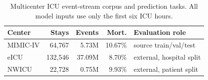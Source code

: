 \begin{table}[t]
\caption{Multicenter ICU event-stream corpus and prediction tasks. All model inputs use only the first six ICU hours.}
\label{tab:dataset_summary}
\centering
\small
\setlength{\tabcolsep}{4.2pt}
\begin{tabular}{lrrrl}
\toprule
Center & Stays & Events & Mort. & Evaluation role \\
\midrule
MIMIC-IV & 64,767 & 5.73M & 10.67\% & source train/val/test \\
eICU & 132,546 & 37.09M & 8.70\% & external, hospital split \\
NWICU & 22,728 & 0.75M & 9.93\% & external, patient split \\
\bottomrule
\end{tabular}
\end{table}
